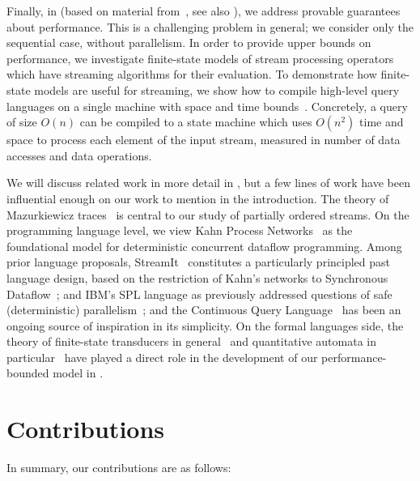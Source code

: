 Finally, in  (based on material from~, see also ), we address provable guarantees about performance. This is a challenging problem in general; we consider only the sequential case, without parallelism. In order to provide upper bounds on performance, we investigate finite-state models of stream processing operators which have streaming algorithms for their evaluation. To demonstrate how finite-state models are useful for streaming, we show how to compile high-level query languages on a single machine with space and time bounds~\cite{QRE,StreamQRE}. Concretely, a query of size $O(n)$ can be compiled to a state machine which uses $O(n^2)$ time and space to process each element of the input stream, measured in number of data accesses and data operations.

We will discuss related work in more detail in , but a few lines of work have been influential enough on our work to mention in the introduction.
The theory of Mazurkiewicz traces~\cite{mazurkiewicz1986trace,DiekertR1995} is central to our study of partially ordered streams.
On the programming language level, we view Kahn Process Networks~\cite{gilles1974semantics} as the foundational model for deterministic concurrent dataflow programming.
Among prior language proposals, StreamIt~\cite{thies2002streamit} constitutes a particularly principled past language design, based on the restriction of Kahn's networks to Synchronous Dataflow~\cite{lee1987synchronous};
and IBM's SPL language as previously addressed questions of safe (deterministic) parallelism~\cite{HAG2013SPL,schneider2013safe,hirzel2014catalog};
and the Continuous Query Language~\cite{CQL,ABW2006CQL} has been an ongoing source of inspiration in its simplicity.
On the formal languages side,
the theory of finite-state transducers in general~\cite{EH2001MDST,AC2010SST}
and quantitative automata in particular~\cite{S1961WA,DKV2009HWA,AdADRY2013CRA}
have played a direct role in the development of our performance-bounded
model in .

\section{Contributions}

In summary, our contributions are as follows:

